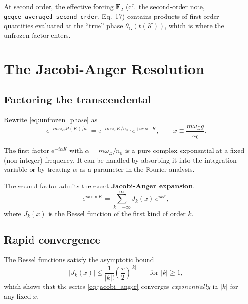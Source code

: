 \documentclass[11pt]{article}
\newcommand{\secondorder}{geqoe\_averaged\_second\_order}
\begin{document}
At second order, the effective forcing $\bm F_2$ (cf.\ the second-order
note, \texttt{\secondorder{}}, Eq.~17) contains products of first-order
quantities evaluated at the ``true'' phase $\theta_G(t(K))$, which is
where the unfrozen factor enters.


\section{The Jacobi-Anger Resolution}
\label{sec:jacobi_anger}

\subsection{Factoring the transcendental}

Rewrite \eqref{eq:unfrozen_phase} as
\begin{equation}
e^{-im\omega_E M(K)/n_0}
= e^{-im\omega_E K / n_0}
\cdot e^{+ix\sin K},
\qquad
x \equiv \frac{m\omega_E g}{n_0}.
\label{eq:factored_phase}
\end{equation}

The first factor $e^{-i\alpha K}$ with $\alpha = m\omega_E/n_0$ is a
pure complex exponential at a fixed (non-integer) frequency. It can be
handled by absorbing it into the integration variable or by treating
$\alpha$ as a parameter in the Fourier analysis.

The second factor admits the exact \textbf{Jacobi-Anger expansion}:
\begin{equation}
e^{ix\sin K}
= \sum_{k=-\infty}^{\infty} J_k(x)\, e^{ikK},
\label{eq:jacobi_anger}
\end{equation}
where $J_k(x)$ is the Bessel function of the first kind of order $k$.

\subsection{Rapid convergence}

The Bessel functions satisfy the asymptotic bound
\begin{equation}
|J_k(x)| \le \frac{1}{|k|!}\left(\frac{x}{2}\right)^{|k|}
\qquad \text{for } |k| \ge 1,
\label{eq:bessel_bound}
\end{equation}
which shows that the series \eqref{eq:jacobi_anger} converges
\emph{exponentially} in $|k|$ for any fixed $x$.
\end{document}
